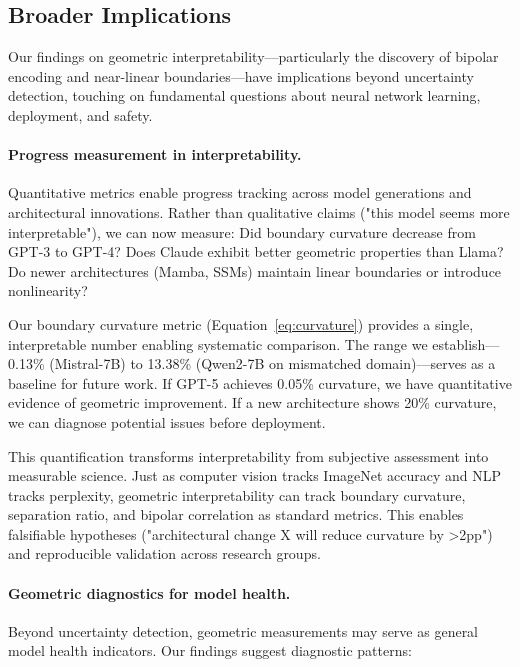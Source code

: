 \documentclass[11pt]{article}
\begin{document}
\subsection{Broader Implications}

Our findings on geometric interpretability—particularly the discovery of bipolar encoding and near-linear boundaries—have implications beyond uncertainty detection, touching on fundamental questions about neural network learning, deployment, and safety.

\paragraph{Progress measurement in interpretability.} 
Quantitative metrics enable progress tracking across model generations and architectural innovations. Rather than qualitative claims ("this model seems more interpretable"), we can now measure: Did boundary curvature decrease from GPT-3 to GPT-4? Does Claude exhibit better geometric properties than Llama? Do newer architectures (Mamba, SSMs) maintain linear boundaries or introduce nonlinearity?

Our boundary curvature metric (Equation~\ref{eq:curvature}) provides a single, interpretable number enabling systematic comparison. The range we establish—0.13\% (Mistral-7B) to 13.38\% (Qwen2-7B on mismatched domain)—serves as a baseline for future work. If GPT-5 achieves 0.05\% curvature, we have quantitative evidence of geometric improvement. If a new architecture shows 20\% curvature, we can diagnose potential issues before deployment.

This quantification transforms interpretability from subjective assessment into measurable science. Just as computer vision tracks ImageNet accuracy and NLP tracks perplexity, geometric interpretability can track boundary curvature, separation ratio, and bipolar correlation as standard metrics. This enables falsifiable hypotheses ("architectural change X will reduce curvature by >2pp") and reproducible validation across research groups.

\paragraph{Geometric diagnostics for model health.}
Beyond uncertainty detection, geometric measurements may serve as general model health indicators. Our findings suggest diagnostic patterns:
\end{document}
